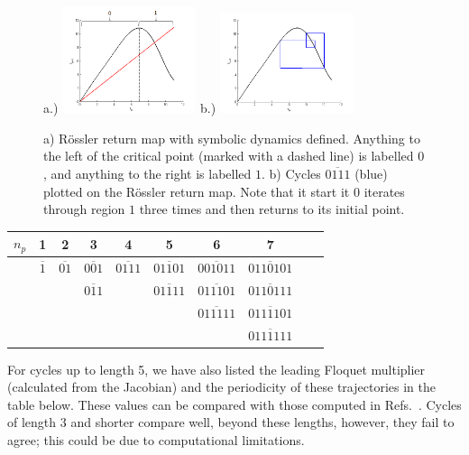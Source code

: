\documentclass[10pt,letter]{article}
\begin{document}
\begin{figure}[h]
\centering
a.)  \includegraphics[width=0.35\textwidth]{Figs/Section4/kcdemon.png}
b.)  \includegraphics[width=0.35\textwidth]{Figs/Section4/kccycle4ross.png}
\caption{
a) R\"ossler return map with symbolic dynamics defined.  Anything to the
left of the critical point (marked with a dashed line) is labelled $0$,
and anything to the right is labelled $1$.
b) Cycles $\overline{0111}$ (blue) plotted on the R\"ossler return map.
Note that it start it $0$ iterates through region $1$ three times and
then returns to its initial point.}
 \label{fig:Ross4cycle}
\end{figure}

\begin{center}
  \begin{tabular}{| l | c | c | c | c | c | c | c | c | r| }
    \hline
    $n_p$ & 1 & 2 & 3 & 4 & 5 & 6 & 7\\ \hline
    & $\overline{1}$ & $\overline{01}$ & $\overline{001}$ & $\overline{0111}$ & $\overline{01101}$ & $\overline{001011}$ & $\overline{0110101}$ \\
    &  &   & $\overline{011}$ &  & $\overline{01111}$ & $\overline{011101}$ & $\overline{0110111}$ \\
    &  &  &  &  &  & $\overline{011111}$ & $\overline{0111101}$ \\
    &  &  &  &  &  &  & $\overline{0111111}$ \\
    \hline
  \end{tabular}
\end{center}

For cycles up to length 5, we have also listed the leading Floquet
multiplier (calculated from the Jacobian) and the periodicity of these
trajectories in the table below.  These values can be compared with those
computed in Refs.~\cite{CB,OtherRoss}.  Cycles of length $3$
and shorter compare well, beyond these lengths, however, they fail to
agree; this could be due to computational limitations.
\end{document}
